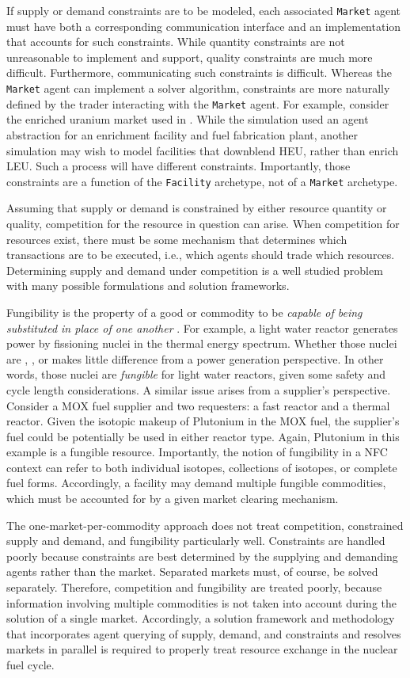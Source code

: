 If supply or demand constraints are to be modeled, each
associated \texttt{Market} agent must have both a corresponding communication
interface and an implementation that accounts for such constraints. While
quantity constraints are not unreasonable to implement and support, quality
constraints are much more difficult. Furthermore, communicating such constraints
is difficult. Whereas the \texttt{Market} agent can implement a solver algorithm,
constraints are more naturally defined by the trader interacting with the
\texttt{Market} agent. For example, consider the enriched uranium market used in
. While the simulation used an agent abstraction for an
enrichment facility and fuel fabrication plant, another simulation may wish to
model facilities that downblend HEU, rather than enrich LEU. Such a process will
have different constraints. Importantly, those constraints are a function of the
\texttt{Facility} archetype, not of a \texttt{Market} archetype.

Assuming that supply or demand is constrained by either resource quantity or
quality, competition for the resource in question can arise.  When competition
for resources exist, there must be some mechanism that determines which
transactions are to be executed, i.e., which agents should trade which
resources. Determining supply and demand under competition is a well studied
problem with many possible formulations and solution frameworks.

Fungibility is the property of a good or commodity to be \textit{capable of
  being substituted in place of one another} \cite{MerriamWebster2014}. For
example, a light water reactor generates power by fissioning nuclei in the
thermal energy spectrum. Whether those nuclei are , ,
or  makes little difference from a power generation perspective. In
other words, those nuclei are \textit{fungible} for light water reactors, given
some safety and cycle length considerations. A similar issue arises from a
supplier's perspective. Consider a MOX fuel supplier and two requesters: a fast
reactor and a thermal reactor. Given the isotopic makeup of Plutonium in the MOX
fuel, the supplier's fuel could be potentially be used in either reactor
type. Again, Plutonium in this example is a fungible resource. Importantly, the
notion of fungibility in a NFC context can refer to both individual isotopes,
collections of isotopes, or complete fuel forms. Accordingly, a facility may
demand multiple fungible commodities, which must be accounted for by a given
market clearing mechanism.

The one-market-per-commodity approach does not treat competition, constrained
supply and demand, and fungibility particularly well. Constraints are handled
poorly because constraints are best determined by the supplying and demanding
agents rather than the market. Separated markets must, of course, be solved
separately. Therefore, competition and fungibility are treated poorly, because
information involving multiple commodities is not taken into account during the
solution of a single market. Accordingly, a solution framework and methodology
that incorporates agent querying of supply, demand, and constraints and resolves
markets in parallel is required to properly treat resource exchange in the
nuclear fuel cycle.
